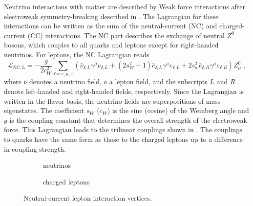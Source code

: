 Neutrino interactions with matter are described by Weak force interactions after electroweak symmetry-breaking described in .
The Lagrangian for these interactions can be written as the sum of the neutral-current (NC) and charged-current (CC) interactions. The NC part describes the exchange of neutral $Z^0$ bosons, which couples to all quarks and leptons except for right-handed neutrinos. For leptons, the NC Lagrangian reads
\begin{equation}
  \mathcal{L}_\mathrm{NC,L} = -\frac{g}{2 c_W^2} \sum_{\mathcal{l}=e,\mu,\tau} (\bar{\nu}_{\mathcal{l}, L} \gamma^\mu \nu_{\mathcal{l}, L} + (2 s_W^2 - 1) \bar{e}_{\mathcal{l}, L} \gamma^\mu e_{\mathcal{l}, L} + 2s_w^2 \bar{e}_{\mathcal{l}, R} \gamma^\mu e_{\mathcal{l}, R}) Z^0_\mu\;, \label{eq:ew-nc-lagrangian}
\end{equation}
where $\nu$ denotes a neutrino field, $e$ a lepton field, and the subscripts $L$ and $R$ denote left-handed and right-handed fields, respectively. Since the Lagrangian is written in the flavor basis, the neutrino fields are superpositions of mass eigenstates. The coefficient $s_W$ ($c_W$) is the sine (cosine) of the Weinberg angle and $g$ is the coupling constant that determines the overall strength of the electroweak force. This Lagrangian leads to the trilinear couplings shown in . The couplings to quarks have the same form as those to the charged leptons up to a difference in coupling strength.
\begin{figure}
\centering
\begin{subfigure}{0.3\linewidth}
    \caption{neutrinos}
\end{subfigure}
\begin{subfigure}{0.3\linewidth}
    \caption{charged leptons}
\end{subfigure}
\caption{Neutral-current lepton interaction vertices.}
\label{fig:nc-vertices}
\end{figure}
